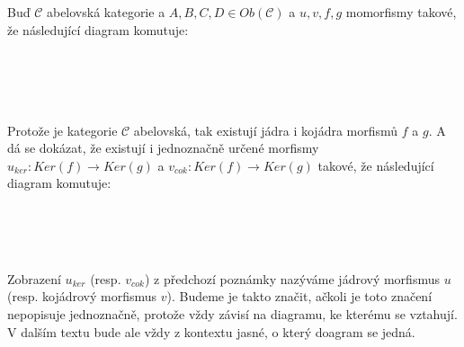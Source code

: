      \begin{pzn}
       Buď $\mathcal C$ abelovská kategorie a $A,B,C,D\in Ob(\mathcal C)$ a $u,v,f,g$ 
       momorfismy takové, že následující diagram komutuje: \\\\
       \centerline{}\\\\\\
      Protože je kategorie $\mathcal C$ abelovská, tak existují jádra i kojádra morfismů $f$ 
      a $g$. A dá se dokázat, že existují i jednoznačně určené morfismy 
      $u_{ker}:Ker(f)\to Ker(g)$ a $v_{cok}:Ker(f)\to Ker(g)$ takové, že následující diagram komutuje: \\\\
       \centerline{}\\\\           
    \end{pzn}
    
    \begin{dfn}
      Zobrazení $u_{ker}$ (resp. $v_{cok}$) z předchozí poznámky nazýváme jádrový 
      morfismus $u$ (resp. kojádrový morfismus $v$). Budeme je takto značit, ačkoli je toto značení 
      nepopisuje jednoznačně, protože vždy závisí na diagramu, ke kterému se 
      vztahují. V dalším textu bude ale vždy z kontextu jasné, o který doagram se jedná.
    \end{dfn}
      \clearpage




 